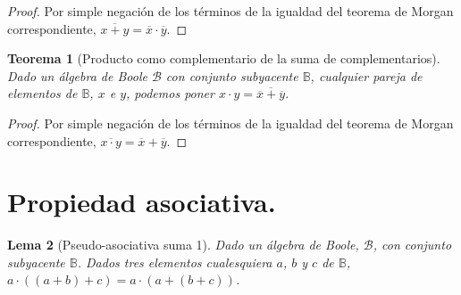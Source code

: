 \documentclass[final,12pt,a4paper,twoside,fleqn]{extbook}
\newcommand{\setB}{\ensuremath{\mathbb{B}}}
\newtheorem{thm}{Teorema}[chapter]
\newtheorem{lem}[thm]{Lema}
\theoremstyle{definition}
\theoremstyle{remark}
\begin{document}
\begin{proof}
Por simple negación de los términos de la igualdad del teorema de Morgan correspondiente, \(\overline{x+y} = \overline{x}\cdot\overline{y}\).
\end{proof}



\begin{thm}[Producto como complementario de la suma de complementarios]
Dado un álgebra de Boole \(\mathscr{B}\) con conjunto subyacente \(\setB\), cualquier pareja de elementos de \(\setB\), \(x\) e \(y\), podemos poner \(x \cdot y=\overline{\overline{x} + \overline{y}}\).
\end{thm}


\begin{proof}
Por simple negación de los términos de la igualdad del teorema de Morgan correspondiente, \(\overline{x \cdot y} = \overline{x} + \overline{y}\).
\end{proof}



\section{Propiedad asociativa.}



\begin{lem}[Pseudo-asociativa suma 1]
Dado un álgebra de Boole, \(\mathscr{B}\), con conjunto subyacente \(\setB\). Dados tres elementos cualesquiera \(a\), \(b\) y \(c\) de \(\setB\), \( a \cdot ( ( a + b ) + c ) = a \cdot ( a + ( b + c ) )\).
\end{lem}
\end{document}
